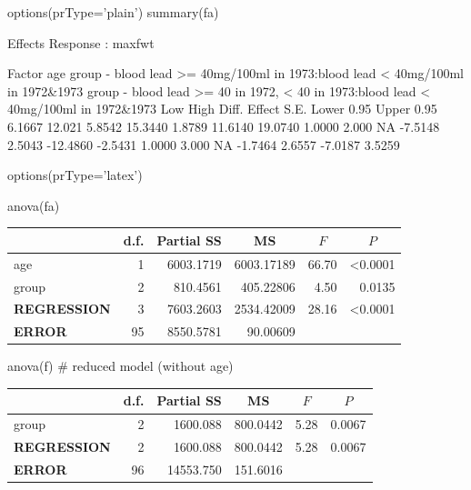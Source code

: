 \begin{Schunk}
\begin{Sinput}
options(prType='plain')
summary(fa)
\end{Sinput}
\begin{Soutput}
             Effects              Response : maxfwt 

 Factor                                                                             
 age                                                                                
 group - blood lead >= 40mg/100ml in 1973:blood lead < 40mg/100ml in 1972&1973      
 group - blood lead >= 40 in 1972, < 40 in 1973:blood lead < 40mg/100ml in 1972&1973
 Low    High   Diff.  Effect  S.E.   Lower 0.95 Upper 0.95
 6.1667 12.021 5.8542 15.3440 1.8789  11.6140   19.0740   
 1.0000  2.000     NA -7.5148 2.5043 -12.4860   -2.5431   
 1.0000  3.000     NA -1.7464 2.6557  -7.0187    3.5259   
\end{Soutput}
\begin{Sinput}
options(prType='latex')
\end{Sinput}
\end{Schunk}
\begin{Sinput}
anova(fa)
\end{Sinput}
\begin{center}
\begin{tabular}{lrrrrr}
\hline\hline
\multicolumn{1}{l}{}&\multicolumn{1}{c}{d.f.}&\multicolumn{1}{c}{Partial SS}&\multicolumn{1}{c}{MS}&\multicolumn{1}{c}{$F$}&\multicolumn{1}{c}{$P$}\tabularnewline
\hline
age& 1&6003.1719&6003.17189&66.70&\textless 0.0001\tabularnewline
group& 2& 810.4561& 405.22806& 4.50&0.0135\tabularnewline
\textbf{REGRESSION}& 3&7603.2603&2534.42009&28.16&\textless 0.0001\tabularnewline
\textbf{ERROR}&95&8550.5781&  90.00609&&\tabularnewline
\hline
\end{tabular}\end{center}
\begin{Sinput}
anova(f)    # reduced model (without age)
\end{Sinput}
\begin{center}
\begin{tabular}{lrrrrr}
\hline\hline
\multicolumn{1}{l}{}&\multicolumn{1}{c}{d.f.}&\multicolumn{1}{c}{Partial SS}&\multicolumn{1}{c}{MS}&\multicolumn{1}{c}{$F$}&\multicolumn{1}{c}{$P$}\tabularnewline
\hline
group& 2& 1600.088&800.0442&5.28&0.0067\tabularnewline
\textbf{REGRESSION}& 2& 1600.088&800.0442&5.28&0.0067\tabularnewline
\textbf{ERROR}&96&14553.750&151.6016&&\tabularnewline
\hline
\end{tabular}\end{center}

